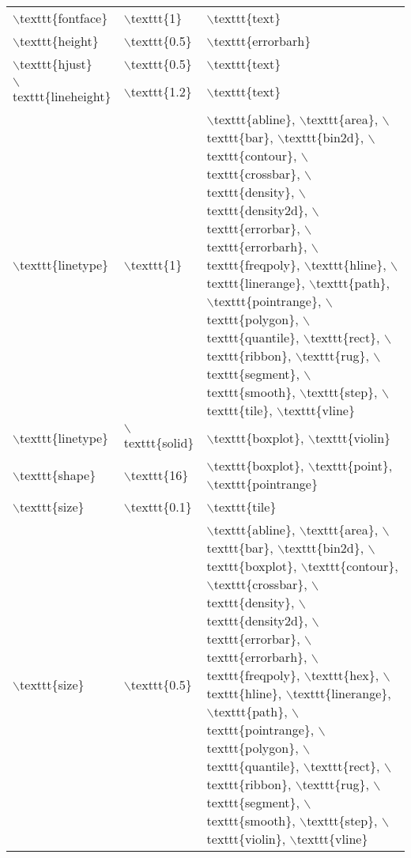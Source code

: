 \begin{table}[ht]
\begin{tabular}{lll}
  $\backslash$texttt\{fontface\} & $\backslash$texttt\{1\} & $\backslash$texttt\{text\} \\ 
  $\backslash$texttt\{height\} & $\backslash$texttt\{0.5\} & $\backslash$texttt\{errorbarh\} \\ 
  $\backslash$texttt\{hjust\} & $\backslash$texttt\{0.5\} & $\backslash$texttt\{text\} \\ 
  $\backslash$texttt\{lineheight\} & $\backslash$texttt\{1.2\} & $\backslash$texttt\{text\} \\ 
  $\backslash$texttt\{linetype\} & $\backslash$texttt\{1\} & $\backslash$texttt\{abline\}, $\backslash$texttt\{area\}, $\backslash$texttt\{bar\}, $\backslash$texttt\{bin2d\}, $\backslash$texttt\{contour\}, $\backslash$texttt\{crossbar\}, $\backslash$texttt\{density\}, $\backslash$texttt\{density2d\}, $\backslash$texttt\{errorbar\}, $\backslash$texttt\{errorbarh\}, $\backslash$texttt\{freqpoly\}, $\backslash$texttt\{hline\}, $\backslash$texttt\{linerange\}, $\backslash$texttt\{path\}, $\backslash$texttt\{pointrange\}, $\backslash$texttt\{polygon\}, $\backslash$texttt\{quantile\}, $\backslash$texttt\{rect\}, $\backslash$texttt\{ribbon\}, $\backslash$texttt\{rug\}, $\backslash$texttt\{segment\}, $\backslash$texttt\{smooth\}, $\backslash$texttt\{step\}, $\backslash$texttt\{tile\}, $\backslash$texttt\{vline\} \\ 
  $\backslash$texttt\{linetype\} & $\backslash$texttt\{solid\} & $\backslash$texttt\{boxplot\}, $\backslash$texttt\{violin\} \\ 
  $\backslash$texttt\{shape\} & $\backslash$texttt\{16\} & $\backslash$texttt\{boxplot\}, $\backslash$texttt\{point\}, $\backslash$texttt\{pointrange\} \\ 
  $\backslash$texttt\{size\} & $\backslash$texttt\{0.1\} & $\backslash$texttt\{tile\} \\ 
  $\backslash$texttt\{size\} & $\backslash$texttt\{0.5\} & $\backslash$texttt\{abline\}, $\backslash$texttt\{area\}, $\backslash$texttt\{bar\}, $\backslash$texttt\{bin2d\}, $\backslash$texttt\{boxplot\}, $\backslash$texttt\{contour\}, $\backslash$texttt\{crossbar\}, $\backslash$texttt\{density\}, $\backslash$texttt\{density2d\}, $\backslash$texttt\{errorbar\}, $\backslash$texttt\{errorbarh\}, $\backslash$texttt\{freqpoly\}, $\backslash$texttt\{hex\}, $\backslash$texttt\{hline\}, $\backslash$texttt\{linerange\}, $\backslash$texttt\{path\}, $\backslash$texttt\{pointrange\}, $\backslash$texttt\{polygon\}, $\backslash$texttt\{quantile\}, $\backslash$texttt\{rect\}, $\backslash$texttt\{ribbon\}, $\backslash$texttt\{rug\}, $\backslash$texttt\{segment\}, $\backslash$texttt\{smooth\}, $\backslash$texttt\{step\}, $\backslash$texttt\{violin\}, $\backslash$texttt\{vline\} \\ 

\end{tabular}
\end{table}
